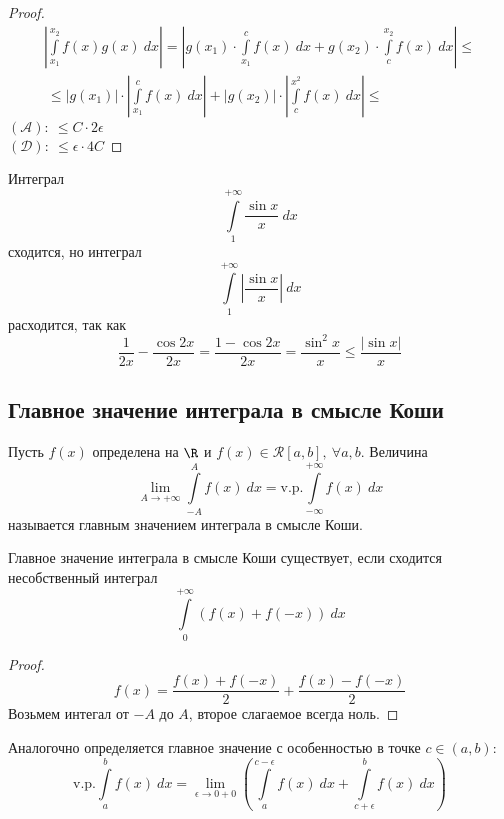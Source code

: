 \begin{proof}
    \begin{multline*}
        \left|\int\limits_{x_1}^{x_2}f(x)g(x)\ dx\right|=\left|g(x_1)\cdot \int\limits_{x_1}^{c}f(x)\ dx+g(x_2)\cdot \int\limits_{c}^{x_2}f(x)\ dx\right|\leq\\\
        \leq |g(x_1)|\cdot \left|\int\limits_{x_1}^{c}f(x)\ dx\right|+|g(x_2)|\cdot \left|\int\limits_{c}^{x^2}f(x)\ dx\right|\leq
    \end{multline*} 
    $(\mathcal{A}):\ \leq C\cdot 2\epsilon$\\
    $(\mathcal{D}):\ \leq \epsilon \cdot 4C$
\end{proof} 
\begin{example} Интеграл 
    \[\int\limits_{1}^{+\infty}\frac{\sin{x}}{x}\ dx\]
    сходится, но интеграл
    \[\int\limits_{1}^{+\infty}\left|\frac{\sin{x}}{x}\right|\ dx\]
    расходится, так как
    \[\frac{1}{2x}-\frac{\cos{2x}}{2x}=\frac{1-\cos{2x}}{2x}=\frac{\sin^2{x}}{x}\leq \frac{|\sin{x}|}{x}\]
\end{example}
\subsection{Главное значение интеграла в смысле Коши}
\begin{definition}
    Пусть $f(x)$ определена на $\R$ и $f(x)\in \mathcal{R}[a,b],\ \forall a,b$. Величина
    \[\lim\limits_{A\to +\infty}\int\limits_{-A}^{A}f(x)\ dx=\text{v.p.} \int\limits_{-\infty}^{+\infty}f(x)\ dx\]
    называется главным значением интеграла в смысле Коши. %
\end{definition} 
\begin{theorem}
    Главное значение интеграла в смысле Коши существует, если сходится несобственный интеграл
    \[\int\limits_{0}^{+\infty}(f(x)+f(-x))\ dx\]
\end{theorem} 
\begin{proof}
    \[f(x)=\frac{f(x)+f(-x)}{2}+\frac{f(x)-f(-x)}{2}\]
    Возьмем интегал от $-A$ до $A$, второе слагаемое всегда ноль.
\end{proof} 
\begin{comm}
    Аналогочно определяется главное значение с особенностью в точке $c\in (a,b)$:
    \[\text{v.p.}\int\limits_{a}^{b}f(x)\ dx=\lim\limits_{\epsilon\to 0+0}\left(\int\limits_{a}^{c-\epsilon}f(x)\ dx+\int\limits_{c+\epsilon}^{b}f(x)\ dx\right)\]
\end{comm} 